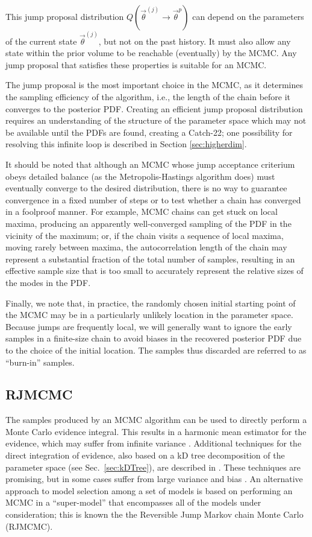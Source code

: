 \documentclass{rsos}
\newcommand{\vtheta}{\vec{\theta}}
\begin{document}
This jump proposal distribution $Q(\vtheta^{(j)} \to \vtheta^p)$ can
depend on the parameters of the current state $\vtheta^{(j)}$, but not
on the past history.  It must also allow any state within the prior
volume to be reachable (eventually) by the MCMC.  Any jump proposal
that satisfies these properties is suitable for an MCMC.

The jump proposal is the most important choice in the MCMC, as it
determines the sampling efficiency of the algorithm, i.e., the length
of the chain before it converges to the posterior PDF.  Creating an
efficient jump proposal distribution requires an understanding of the
structure of the parameter space which may not be available until the
PDFs are found, creating a Catch-22; one possibility for resolving
this infinite loop is described in Section \ref{sec:higherdim}.

It should be noted that although an MCMC whose jump acceptance
criterium obeys detailed balance (as the Metropolis-Hastings algorithm
does) must eventually converge to the desired distribution, there is
no way to guarantee convergence in a fixed number of steps or to test
whether a chain has converged in a foolproof manner.  For example,
MCMC chains can get stuck on local maxima, producing an apparently
well-converged sampling of the PDF in the vicinity of the maximum; or,
if the chain visits a sequence of local maxima, moving rarely between
maxima, the autocorrelation length of the chain may represent a
substantial fraction of the total number of samples, resulting in an
effective sample size that is too small to accurately represent the
relative sizes of the modes in the PDF.

Finally, we note that, in practice, the randomly chosen initial
starting point of the MCMC may be in a particularly unlikely location
in the parameter space.  Because jumps are frequently local, we will
generally want to ignore the early samples in a finite-size chain to
avoid biases in the recovered posterior PDF due to the choice of the
initial location.  The samples thus discarded are referred to as
``burn-in'' samples. 

\subsection{RJMCMC}\label{RJMCMC}

The samples produced by an MCMC algorithm can be used to directly
perform a Monte Carlo evidence integral.  This results in a harmonic
mean estimator for the evidence, which may suffer from infinite variance \cite{NewtonRaftery:1994,Chib:1995,vanHaasteren:2009,WolpertSchmidler:2012}.
Additional techniques for the direct integration of evidence, also
based on a kD tree decomposition of the parameter space (see
Sec.~\ref{sec:kDTree}), are described in \cite{Weinberg2009}.  These
techniques are promising, but in some cases suffer 
from large variance and bias \cite{Farr2010}.  An alternative approach to model
selection among a set of models is based on performing an MCMC in a
``super-model'' that encompasses all of the models under
consideration; this is known the the Reversible Jump Markov chain
Monte Carlo (RJMCMC).
\end{document}
